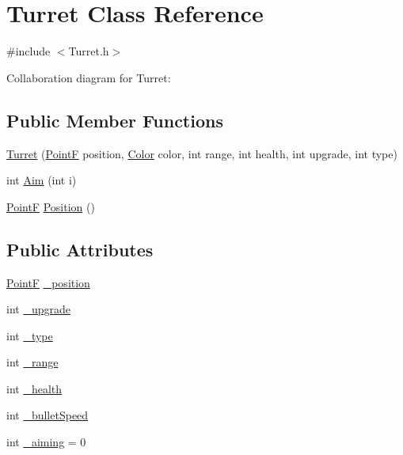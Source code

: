 \hypertarget{class_turret}{}\section{Turret Class Reference}
\label{class_turret}


{\ttfamily \#include $<$Turret.\+h$>$}



Collaboration diagram for Turret\+:
\subsection*{Public Member Functions}
\begin{DoxyCompactItemize}
\item 
\hyperlink{class_turret_a7c56fc2fe7272313a06fb69262f9f2e4}{Turret} (\hyperlink{drawtools_8h_adc4a66bcb59b74164130ed47cb387ec3}{PointF} position, \hyperlink{struct_color}{Color} color, int range, int health, int upgrade, int type)
\item 
int \hyperlink{class_turret_a8d3b80c4fd7534448f5e7e7ce6618062}{Aim} (int i)
\item 
\hyperlink{drawtools_8h_adc4a66bcb59b74164130ed47cb387ec3}{PointF} \hyperlink{class_turret_a86f457d14098684ab3954864b07dc560}{Position} ()
\end{DoxyCompactItemize}
\subsection*{Public Attributes}
\begin{DoxyCompactItemize}
\item 
\hyperlink{drawtools_8h_adc4a66bcb59b74164130ed47cb387ec3}{PointF} \hyperlink{class_turret_a0ef0ca5baa391a6874f97b6b3e440432}{\+\_\+position}
\item 
int \hyperlink{class_turret_a9af84b28b71291fd780c2959d331532d}{\+\_\+upgrade}
\item 
int \hyperlink{class_turret_a53bde4ee8aab3c1e2733445bfe26fb22}{\+\_\+type}
\item 
int \hyperlink{class_turret_ae0343faa95df71e2a8bf7269e617fc72}{\+\_\+range}
\item 
int \hyperlink{class_turret_ab2bf5de8417b19dd7d78f29ce041a16a}{\+\_\+health}
\item 
int \hyperlink{class_turret_a5c5b20c2a2e56f4ced002b7d79be0b25}{\+\_\+bullet\+Speed}
\item 
int \hyperlink{class_turret_a359ea4b0d1eb06880d0971dbc1c77c60}{\+\_\+aiming} = 0
\end{DoxyCompactItemize}


